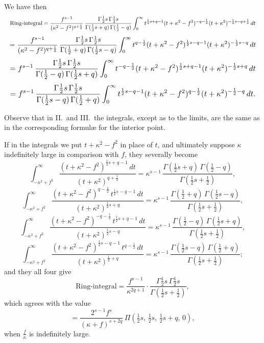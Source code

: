 \documentclass[11pt]{article}
\begin{document}
We have then
\[
\resizebox{\textwidth}{!}{$\displaystyle
\text{Ring-integral}
= \frac{f^{s-1}}{(\kappa^{2}-f^{2})^{q+\frac{1}{2}}}\,\frac{\Gamma\tfrac{1}{2}s\,\Gamma\tfrac{1}{2}s}{\Gamma(\tfrac{1}{2}s+q)\,\Gamma(\tfrac{1}{2}-q)}\int_{0}^{\infty} t^{\frac{1}{2}s+q-1}(t+\kappa^{2}-f^{2})^{-q-\frac{1}{2}}(t+\kappa^{2})^{-\frac{1}{2}s-q+\frac{1}{2}}\,dt$}
\]
\[
\resizebox{\textwidth}{!}{$\displaystyle
= \frac{f^{s-1}}{(\kappa^{2}-f^{2})^{q+\frac{1}{2}}}\,\frac{\Gamma\tfrac{1}{2}s\,\Gamma\tfrac{1}{2}s}{\Gamma(\tfrac{1}{2}+q)\,\Gamma(\tfrac{1}{2}s-q)}\int_{0}^{\infty} t^{q-\frac{1}{2}}(t+\kappa^{2}-f^{2})^{\frac{1}{2}s-q-1}(t+\kappa^{2})^{-\frac{1}{2}s-q}\,dt$}
\]
\[
\resizebox{\textwidth}{!}{$\displaystyle
= f^{s-1}\,\frac{\Gamma\tfrac{1}{2}s\,\Gamma\tfrac{1}{2}s}{\Gamma(\tfrac{1}{2}-q)\,\Gamma(\tfrac{1}{2}s+q)}\int_{0}^{\infty} t^{-q-\frac{1}{2}}(t+\kappa^{2}-f^{2})^{\frac{1}{2}s+q-1}(t+\kappa^{2})^{-\frac{1}{2}s+q}\,dt$}
\]
\[
\resizebox{\textwidth}{!}{$\displaystyle
= f^{s-1}\,\frac{\Gamma\tfrac{1}{2}s\,\Gamma\tfrac{1}{2}s}{\Gamma(\tfrac{1}{2}s-q)\,\Gamma(\tfrac{1}{2}+q)}\int_{0}^{\infty} t^{\frac{1}{2}s-q-1}(t+\kappa^{2}-f^{2})^{q-\frac{1}{2}}(t+\kappa^{2})^{-\frac{1}{2}-q}\,dt.$}
\]

Observe that in II.\ and III.\ the integrals, except as to the limits, are the same as in the corresponding formul{\ae} for the interior point.

If in the integrals we put $t+\kappa^{2}-f^{2}$ in place of $t$, and ultimately suppose $\kappa$ indefinitely large in comparison with $f$, they severally become
\[
\int_{-\kappa^{2}+f^{2}}^{\infty}\frac{(t+\kappa^{2}-f^{2})^{\frac{1}{2}s+q-1}\,dt}{(t+\kappa^{2})^{q+\frac{1}{2}}} = \kappa^{s-1}\,\frac{\Gamma(\tfrac{1}{2}s+q)\,\Gamma(\tfrac{1}{2}-q)}{\Gamma(\tfrac{1}{2}s+\tfrac{1}{2})},
\]
\[
\int_{-\kappa^{2}+f^{2}}^{\infty}\frac{(t+\kappa^{2}-f^{2})^{q-\frac{1}{2}}\,t^{\frac{1}{2}s-q-1}\,dt}{(t+\kappa^{2})^{\frac{1}{2}s+q}} = \kappa^{s-1}\,\frac{\Gamma(\tfrac{1}{2}+q)\,\Gamma(\tfrac{1}{2}s-q)}{\Gamma(\tfrac{1}{2}s+\tfrac{1}{2})},
\]
\[
\int_{-\kappa^{2}+f^{2}}^{\infty}\frac{(t+\kappa^{2}-f^{2})^{-q-\frac{1}{2}}\,t^{\frac{1}{2}s+q-1}\,dt}{(t+\kappa^{2})^{\frac{1}{2}s-q}} = \kappa^{s-1}\,\frac{\Gamma(\tfrac{1}{2}-q)\,\Gamma(\tfrac{1}{2}s+q)}{\Gamma(\tfrac{1}{2}s+\tfrac{1}{2})},
\]
\[
\int_{-\kappa^{2}+f^{2}}^{\infty}\frac{(t+\kappa^{2}-f^{2})^{\frac{1}{2}s-q-1}\,t^{q-\frac{1}{2}}\,dt}{(t+\kappa^{2})^{\frac{1}{2}+q}} = \kappa^{s-1}\,\frac{\Gamma(\tfrac{1}{2}s-q)\,\Gamma(\tfrac{1}{2}+q)}{\Gamma(\tfrac{1}{2}s+\tfrac{1}{2})};
\]
and they all four give
\[
\text{Ring-integral} = \frac{f^{s-1}}{\kappa^{2q+1}}\cdot\frac{\Gamma\tfrac{1}{2}s\,\Gamma\tfrac{1}{2}s}{\Gamma(\tfrac{1}{2}s+\tfrac{1}{2})},
\]
which agrees with the value
\[
= \frac{2^{s-1}f^{s}}{(\kappa+f)^{s+2q}}\,\Pi(\tfrac{1}{2}s,\,\tfrac{1}{2}s,\,\tfrac{1}{2}s+q,\,0),
\]
when $\tfrac{f}{\kappa}$ is indefinitely large.
\end{document}
